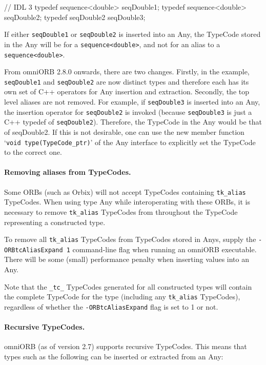 \documentclass[11pt,twoside,a4paper]{book}
\newcommand{\type}[1]{\texttt{#1}}
\newcommand{\code}[1]{\texttt{#1}}
\begin{document}
\begin{idllisting}
// IDL 3
typedef sequence<double> seqDouble1;
typedef sequence<double> seqDouble2;
typedef seqDouble2       seqDouble3;
\end{idllisting}

If either \type{seqDouble1} or \type{seqDouble2} is inserted into an
Any, the TypeCode stored in the Any will be for a
\code{sequence<double>}, and not for an alias to a
\code{sequence<double>}.

From omniORB 2.8.0 onwards, there are two changes. Firstly, in the
example, \type{seqDouble1} and \type{seqDouble2} are now distinct
types and therefore each has its own set of C++ operators for Any
insertion and extraction. Secondly, the top level aliases are not
removed. For example, if \type{seqDouble3} is inserted into an Any,
the insertion operator for \type{seqDouble2} is invoked (because
\type{seqDouble3} is just a C++ typedef of
\type{seqDouble2}). Therefore, the TypeCode in the Any would be that
of seqDouble2. If this is not desirable, one can use the new member
function `\code{void type(TypeCode\_ptr)}' of the Any interface to
explicitly set the TypeCode to the correct one.


\paragraph*{Removing aliases from TypeCodes.}
Some ORBs (such as Orbix) will not accept TypeCodes containing
\code{tk\_alias} TypeCodes. When using type Any while interoperating
with these ORBs, it is necessary to remove \code{tk\_alias} TypeCodes
from throughout the TypeCode representing a constructed type.

To remove all \code{tk\_alias} TypeCodes from TypeCodes stored in
Anys, supply the \texttt{-ORBtcAliasExpand 1} command-line flag when
running an omniORB executable. There will be some (small) performance
penalty when inserting values into an Any.

Note that the \code{\_tc\_} TypeCodes generated for all constructed
types will contain the complete TypeCode for the type (including any
\code{tk\_alias} TypeCodes), regardless of whether the
\texttt{-ORBtcAliasExpand} flag is set to 1 or not.

\paragraph*{Recursive TypeCodes.}
omniORB (as of version 2.7) supports recursive TypeCodes. This means
that types such as the following can be inserted or extracted from an
Any:
\end{document}
